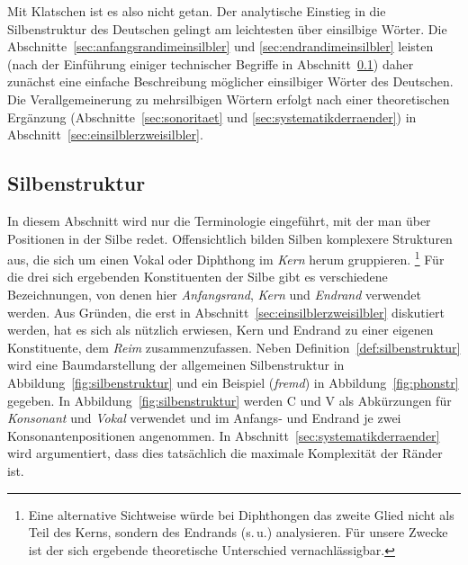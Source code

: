
Mit Klatschen ist es also nicht getan.
Der analytische Einstieg in die Silbenstruktur des Deutschen gelingt am leichtesten über einsilbige Wörter.
Die Abschnitte~\ref{sec:anfangsrandimeinsilbler} und \ref{sec:endrandimeinsilbler} leisten (nach der Einführung einiger technischer Begriffe in Abschnitt~\ref{sec:silbenstruktur}) daher zunächst eine einfache Beschreibung möglicher einsilbiger Wörter des Deutschen.
Die Verallgemeinerung zu mehrsilbigen Wörtern erfolgt nach einer theoretischen Ergänzung (Abschnitte~\ref{sec:sonoritaet} und \ref{sec:systematikderraender}) in Abschnitt~\ref{sec:einsilblerzweisilbler}.


\subsection{Silbenstruktur}

\label{sec:silbenstruktur}

In diesem Abschnitt wird nur die Terminologie eingeführt, mit der man über Positionen in der Silbe redet.
Offensichtlich bilden Silben komplexere Strukturen aus, die sich um einen Vokal oder Diphthong im \textit{Kern} herum gruppieren.%
\footnote{Eine alternative Sichtweise würde bei Diphthongen das zweite Glied nicht als Teil des Kerns, sondern des Endrands (s.\,u.) analysieren.
Für unsere Zwecke ist der sich ergebende theoretische Unterschied vernachlässigbar.}
Für die drei sich ergebenden Konstituenten der Silbe gibt es verschiedene Bezeichnungen, von denen hier \textit{Anfangsrand}, \textit{Kern} und \textit{Endrand} verwendet werden.
Aus Gründen, die erst in Abschnitt~\ref{sec:einsilblerzweisilbler} diskutiert werden, hat es sich als nützlich erwiesen, Kern und Endrand zu einer eigenen Konstituente, dem \textit{Reim} zusammenzufassen.
Neben Definition~\ref{def:silbenstruktur} wird eine Baumdarstellung der allgemeinen Silbenstruktur in Abbildung~\ref{fig:silbenstruktur} und ein Beispiel (\textit{fremd}) in Abbildung~\ref{fig:phonstr} gegeben.
In Abbildung~\ref{fig:silbenstruktur} werden C und V als Abkürzungen für \textit{Konsonant} und \textit{Vokal} verwendet und im Anfangs- und Endrand je zwei Konsonantenpositionen angenommen.
In Abschnitt~\ref{sec:systematikderraender} wird argumentiert, dass dies tatsächlich die maximale Komplexität der Ränder ist.

